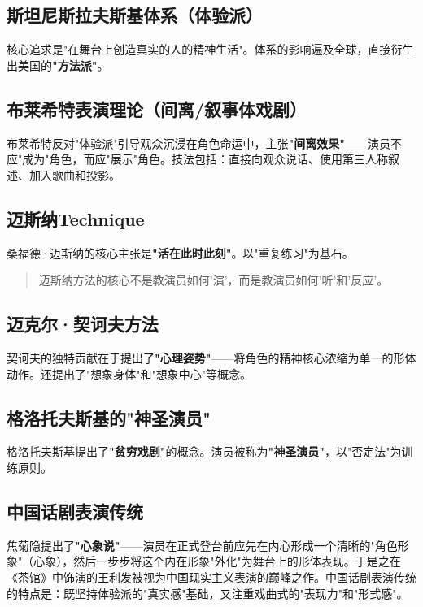 \subsection{斯坦尼斯拉夫斯基体系（体验派）}

核心追求是"在舞台上创造真实的人的精神生活"\cite{stanislavski:system}。体系的影响遍及全球，直接衍生出美国的\textbf{"方法派"}。

\subsection{布莱希特表演理论（间离/叙事体戏剧）}

布莱希特反对"体验派"引导观众沉浸在角色命运中，主张\textbf{"间离效果"}——演员不应"成为"角色，而应"展示"角色\cite{brecht:tools}。技法包括：直接向观众说话、使用第三人称叙述、加入歌曲和投影。

\subsection{迈斯纳Technique}

桑福德·迈斯纳的核心主张是\textbf{"活在此时此刻"}。以"重复练习"为基石\cite{he:meisner}。

\begin{quote}
迈斯纳方法的核心不是教演员如何'演'，而是教演员如何'听'和'反应'。\cite{he:meisner}
\end{quote}

\subsection{迈克尔·契诃夫方法}

契诃夫的独特贡献在于提出了\textbf{"心理姿势"}——将角色的精神核心浓缩为单一的形体动作。还提出了"想象身体"和"想象中心"等概念\cite{chekhov:technique}。

\subsection{格洛托夫斯基的"神圣演员"}

格洛托夫斯基提出了\textbf{"贫穷戏剧"}的概念。演员被称为\textbf{"神圣演员"}，以"否定法"为训练原则\cite{grotowski:theatre}。

\subsection{中国话剧表演传统}

焦菊隐提出了\textbf{"心象说"}——演员在正式登台前应先在内心形成一个清晰的"角色形象"（心象），然后一步步将这个内在形象"外化"为舞台上的形体表现。于是之在《茶馆》中饰演的王利发被视为中国现实主义表演的巅峰之作。中国话剧表演传统的特点是：既坚持体验派的"真实感"基础，又注重戏曲式的"表现力"和"形式感"。
